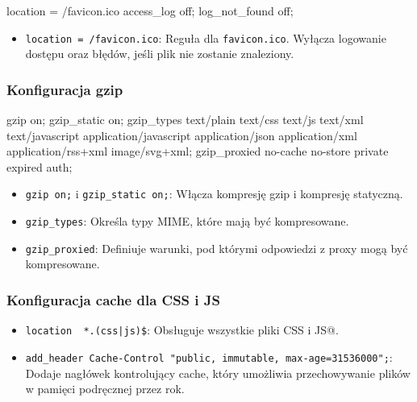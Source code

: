 \begin{longlisting}[language=nginx,label={lst:n2}]
  location = /favicon.ico { access_log off; log_not_found off; }
\end{longlisting}
\begin{itemize}
    \item \texttt{location = /favicon.ico}: Reguła dla \texttt{favicon.ico}.
    Wyłącza logowanie dostępu oraz błędów, jeśli plik nie zostanie znaleziony.
\end{itemize}

\subsubsection{Konfiguracja gzip}
\begin{longlisting}[language=nginx,label={lst:n3}]
  gzip on;
  gzip_static on;
  gzip_types
    text/plain
    text/css
    text/js
    text/xml
    text/javascript
    application/javascript
    application/json
    application/xml
    application/rss+xml
    image/svg+xml;
  gzip_proxied no-cache no-store private expired auth;
\end{longlisting}
\begin{itemize}
    \item \texttt{gzip on;} i \texttt{gzip\_static on;}: Włącza kompresję gzip i kompresję statyczną.
    \item \texttt{gzip\_types}: Określa typy MIME, które mają być kompresowane.
    \item \texttt{gzip\_proxied}: Definiuje warunki, pod którymi odpowiedzi z proxy mogą być kompresowane.
\end{itemize}

\subsubsection{Konfiguracja cache dla CSS i JS}
\begin{itemize}
    \item \texttt{location ~*.(css|js)\$}: Obsługuje wszystkie pliki CSS i JS@.
    \item \texttt{add\_header Cache-Control "public, immutable, max-age=31536000";}: Dodaje nagłówek kontrolujący cache, który umożliwia przechowywanie plików w pamięci podręcznej przez rok.
\end{itemize}

